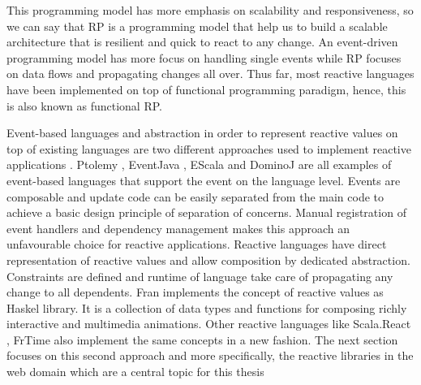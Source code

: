 This programming model has more emphasis on scalability and responsiveness, so we can say that RP is a programming model that help us to build a scalable architecture that is resilient and quick to react to any change. An event-driven programming model has more focus on handling single events while RP focuses on data flows and propagating changes all over.
Thus far, most reactive languages have been implemented on top of functional programming paradigm, hence, this is also known as functional RP.

Event-based languages and abstraction in order to represent reactive values on top of existing languages are two different approaches used to implement reactive applications \cite{Salvaneschi:2014:RBO:2577080.2577083}. 
Ptolemy \cite{Rajan2008}, EventJava \cite{Eugster2009}, EScala \cite{Gasiunas:2011:EME:1960275.1960303} and DominoJ \cite{Zhuang:2013:MSS:2451436.2451460} are all examples of event-based languages that support the event on the language level. Events are composable and update code can be easily separated from the main code to achieve a basic design principle of separation of concerns. Manual registration of event handlers and dependency management makes this approach an unfavourable choice for reactive applications.
Reactive languages have direct representation of reactive values and allow composition by dedicated abstraction. Constraints are defined and runtime of language take care of propagating any change to all dependents.
Fran \cite{Elliott:1997:FRA:258949.258973} implements the concept of reactive values as Haskel library. It is a collection of data types and functions for composing richly interactive and multimedia animations. Other reactive languages like Scala.React \cite{EPFL-REPORT-176887}, FrTime \cite{Cooper2006} also implement the same concepts in a new fashion.
The next section focuses on this second approach and more specifically, the reactive libraries in the web domain which are a central topic for this thesis

